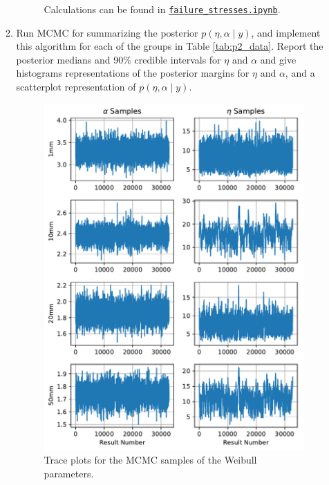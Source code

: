 \documentclass[letterpaper,11pt]{article}
\begin{document}
\begin{enumerate}
\begin{enumerate}
\begin{description}
      Calculations can be found in
      \href{http://nbviewer.jupyter.org/github/ppham27/stat570/blob/master/hw6/failure\_stresses.ipynb}{\texttt{failure\_stresses.ipynb}}.
    \end{description}
  \item Run MCMC for summarizing the posterior
    $p\left(\eta, \alpha \mid y\right)$, and implement this algorithm for each
    of the groups in Table \ref{tab:p2_data}. Report the posterior medians and
    90\% credible intervals for $\eta$ and $\alpha$ and give histograms
    representations of the posterior margins for $\eta$ and $\alpha$, and a
    scatterplot representation of $p\left(\eta, \alpha \mid y\right)$.

    \begin{figure}
      \centering
      \includegraphics{p2_trace.pdf}
      \caption{Trace plots for the MCMC samples of the Weibull parameters.}
      \label{fig:p2_trace}
    \end{figure}


\end{enumerate}
\end{enumerate}
\end{document}
